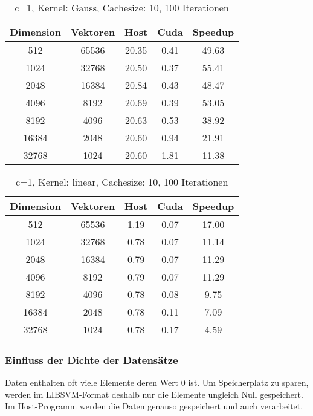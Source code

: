 \documentclass[ngerman]{scrartcl}
\begin{document}
\begin{table}
\begin{center}
\begin{tabular}{|c|c|c|c|c|}
\hline
Dimension & Vektoren & Host & Cuda & Speedup \\
\hline
512 & 65536 & 20.35 & 0.41 & 49.63 \\
1024 & 32768 & 20.50 & 0.37 & 55.41 \\
2048 & 16384 & 20.84 & 0.43 & 48.47 \\
4096 & 8192 & 20.69 & 0.39 & 53.05 \\
8192 & 4096 & 20.63 & 0.53 & 38.92 \\
16384 & 2048 & 20.60 & 0.94 & 21.91 \\
32768 & 1024 & 20.60 & 1.81 & 11.38 \\
\hline
\end{tabular}
\end{center}
\caption{ c=1, Kernel: Gauss, Cachesize: 10, 100 Iterationen}
\label{tbl:ratio-gauss-10}
\end{table}

\begin{table}
\begin{center}
\begin{tabular}{|c|c|c|c|c|}
\hline
Dimension & Vektoren & Host & Cuda & Speedup \\
\hline
512 & 65536 & 1.19 & 0.07 & 17.00 \\
1024 & 32768 & 0.78 & 0.07 & 11.14 \\
2048 & 16384 & 0.79 & 0.07 & 11.29 \\
4096 & 8192 & 0.79 & 0.07 & 11.29 \\
8192 & 4096 & 0.78 & 0.08 & 9.75 \\
16384 & 2048 & 0.78 & 0.11 & 7.09 \\
32768 & 1024 & 0.78 & 0.17 & 4.59 \\
\hline
\end{tabular}
\end{center}
\caption{ c=1, Kernel: linear, Cachesize: 10, 100 Iterationen}
\label{tbl:ratio-linear-10}
\end{table}

\subsubsection{Einfluss der Dichte der Datensätze}
Daten enthalten oft viele Elemente deren Wert $0$ ist. Um Speicherplatz zu sparen, werden im LIBSVM-Format deshalb nur die Elemente ungleich Null gespeichert. Im Host-Programm werden die Daten genauso gespeichert und auch verarbeitet.
\end{document}
